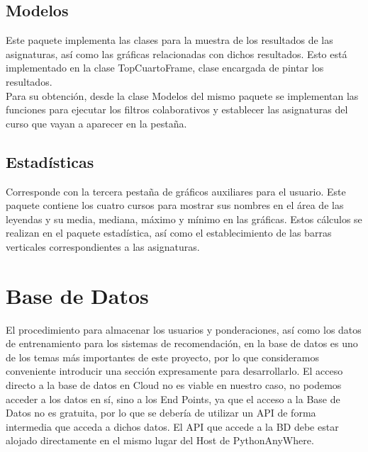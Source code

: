 \subsection{Modelos}
Este paquete implementa las clases para la muestra de los resultados de las asignaturas, así como las gráficas relacionadas con dichos resultados. Esto está implementado en la clase TopCuartoFrame, clase encargada de pintar los resultados. \\Para su obtención, desde la clase Modelos del mismo paquete se implementan las funciones para ejecutar los filtros colaborativos y establecer las asignaturas del curso que vayan a aparecer en la pestaña. 

\subsection{Estadísticas}
Corresponde con la tercera pestaña de gráficos auxiliares para el usuario. Este paquete contiene los cuatro cursos para mostrar sus nombres en el área de las leyendas y su media, mediana, máximo y mínimo en las gráficas. Estos cálculos se realizan en el paquete estadística, así como el establecimiento de las barras verticales correspondientes a las asignaturas.


\section{Base de Datos} 
El procedimiento para almacenar los usuarios y ponderaciones, así como los datos de entrenamiento para los sistemas de recomendación, en la base de datos es uno de los temas más importantes de este proyecto, por lo que consideramos conveniente introducir una sección expresamente para desarrollarlo. 
El acceso directo a la base de datos en Cloud no es viable en nuestro caso, no podemos acceder a los datos en sí, sino a los End Points, ya que el acceso a la Base de Datos no es gratuita, por lo que se debería de utilizar un API de forma intermedia que acceda a dichos datos. 
El API que accede a la BD debe estar alojado directamente en el mismo lugar del Host de PythonAnyWhere. 
